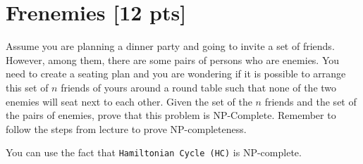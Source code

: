 \documentclass{article}
\begin{document}
\section{Frenemies [12 pts]} 

Assume you are planning a dinner party and going to invite a set of friends. However, among them, there are some pairs of persons who are enemies. You need to create a seating plan and you are wondering if it is possible to arrange this set of $n$ friends of yours around a round table such that none of the two enemies will seat next to each other. Given the set of the $n$ friends and the set of the pairs of enemies, prove that this problem is NP-Complete. Remember to follow the steps from lecture to prove NP-completeness.

You can use the fact that \texttt{Hamiltonian Cycle (HC)} is NP-complete.
\end{document}
